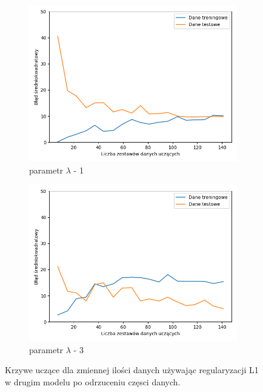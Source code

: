 \documentclass[12pt]{aghdpl}
\begin{document}
\begin{figure}[h]
		 	\begin{subfigure}{.5\linewidth}
		 		\includegraphics[width =\linewidth]{wykresy/7_badanie_danych/l1/regularyzacja_1_learning_curves.png}
		 		\caption{parametr $\lambda$ - 1}
		 	\end{subfigure}
		 	\begin{subfigure}{.5\linewidth}
		 		\includegraphics[width =\linewidth]{wykresy/7_badanie_danych/l1/regularyzacja_3_learning_curves.png}
		 		\caption{parametr $\lambda$ - 3}
		 	\end{subfigure}
		  	
		  	\caption{Krzywe uczące dla zmiennej ilości danych używając regularyzacji L1 w drugim modelu po odrzuceniu częsci danych.}
			\label{fig: drugi_model_przy_regularyzacji_l1_po_odrzuceniu_czesci_danych_learning_curves}
		\end{figure}
		 	
\end{document}
